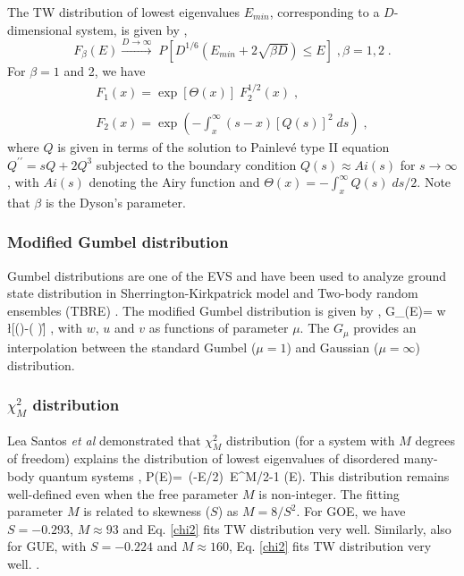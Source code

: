 The TW distribution of lowest eigenvalues $E_{min}$, corresponding to a $D$-dimensional system,  is given by \cite{TW-1, TW-2, TW-3},
\begin{equation}
F_\beta(E)  \displaystyle\stackrel{D \to \infty}{\longrightarrow} \; P\left[ D^{1/6} (E_{min} + 2\sqrt{\beta D}) \leq E \right] \;,  \beta = 1, 2\;.
\end{equation}
For $\beta = 1$ and 2, we have
\begin{equation}
\begin{array}{l}
F_1(x) = \exp[\Theta(x)] \; F_2^{1/2}(x) \;, 
\\ \\
F_2(x) = \exp \left( - \displaystyle\int_x^\infty (s-x) [Q(s)]^2 \; ds\right) \;,
\end{array}
\label{eq-tw}
\end{equation}
where $Q$ is given in terms of the solution to Painlevé type II equation $Q^{\prime\prime} = sQ + 2Q^3$ subjected to the boundary condition $Q(s) \approx Ai(s)$ for $s \to \infty$, with $Ai(s)$ denoting the Airy function and $\Theta(x) = -\int_x^\infty Q(s) \; ds/2$.  Note that $\beta$ is the Dyson's parameter.

\subsubsection{Modified Gumbel distribution}

Gumbel distributions are one of the EVS and have been used to analyze ground state distribution in Sherrington-Kirkpatrick model  \cite{Pa-08} and Two-body random ensembles (TBRE) \cite{IJMPE-2018}.  The modified Gumbel distribution is given by \cite{Gumbel-1958, Galambos-1987},
\be
G_{\mu}(E)= w \exp \l[\mu\left(\right)-\mu\exp \left(
\right)\r] \;,
\label{gumbel}
\ee
with $w$, $u$ and $v$ as functions of parameter $\mu$. The $G_{\mu}$ provides an interpolation between the standard Gumbel ($\mu=1$) and Gaussian ($\mu =\infty$) distribution.  

\subsubsection{$\chi^2_M$ distribution}

Lea Santos {\it et al} demonstrated that $\chi^2_M$ distribution (for a system with $M$ degrees of freedom) explains the distribution of lowest eigenvalues of disordered many-body quantum systems \cite{PRE-22},
\be
P(E)=\, \exp(-E/2)\, E^{M/2-1}\;\; (E).
\label{chi2}
\ee
This distribution remains well-defined even when the free parameter $M$ is non-integer.  The fitting  parameter $M$ is related to skewness ($S$) as $M=8/S^2$.  For GOE, we have $S = -0.293$, $M \approx 93$ and Eq. \eqref{chi2} fits TW distribution very well.  Similarly,  also for GUE, with $S=-0.224$ and $M \approx 160$, Eq. \eqref{chi2} fits TW distribution very well. .

